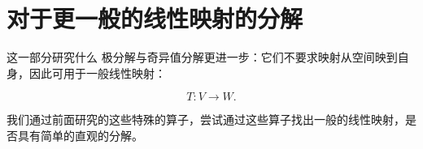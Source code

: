 
\part{对于更一般的线性映射的分解}

\thispagestyle{plain}
\begin{partintro}{这一部分研究什么}
极分解与奇异值分解更进一步：它们不要求映射从空间映到自身，因此可用于一般线性映射：

\[
T:V\to W.
\]

我们通过前面研究的这些特殊的算子，尝试通过这些算子找出一般的线性映射，是否具有简单的直观的分解。
\end{partintro}
